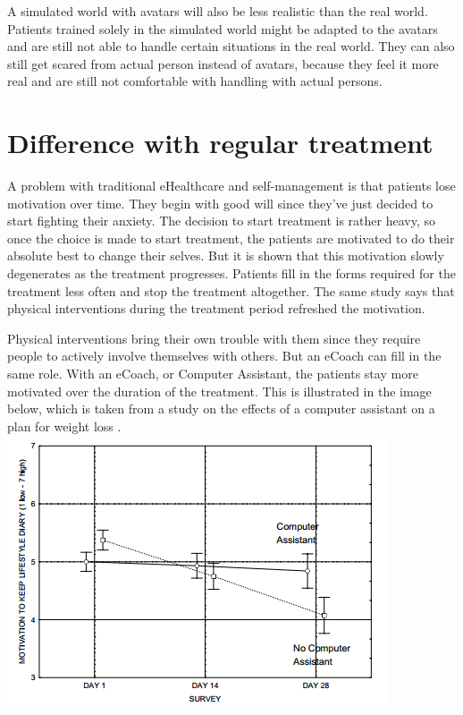 \documentclass[twoside]{article}
\begin{document}
\begin{multicols}{2}
A simulated world with avatars will also be less realistic than the real world. Patients trained solely in the simulated world might be adapted to the avatars and are still not able to handle certain situations in the real world. They can also still get scared from actual person instead of avatars, because they feel it more real and are still not comfortable with handling with actual persons. 






\section{Difference with regular treatment}
A problem with traditional eHealthcare and self-management is that patients lose motivation over time. They begin with good will since they've just decided to start fighting their anxiety. The decision to start treatment is rather heavy, so once the choice is made to start treatment, the patients are motivated to do their absolute best to change their selves. But it is shown \cite{alpay2007} that this motivation slowly degenerates as the treatment progresses. Patients fill in the forms required for the treatment less often and stop the treatment altogether. The same study says that physical interventions during the treatment period refreshed the motivation.

Physical interventions bring their own trouble with them since they require people to actively involve themselves with others. But an eCoach can fill in the same role. With an eCoach, or Computer Assistant, the patients stay more motivated over the duration of the treatment. This is illustrated in the image below, which is taken from a study on the effects of a computer assistant on a plan for weight loss \cite{blanson2009online}.\\
\includegraphics[scale=0.6]{Graph1.png}


\end{multicols}
\end{document}
